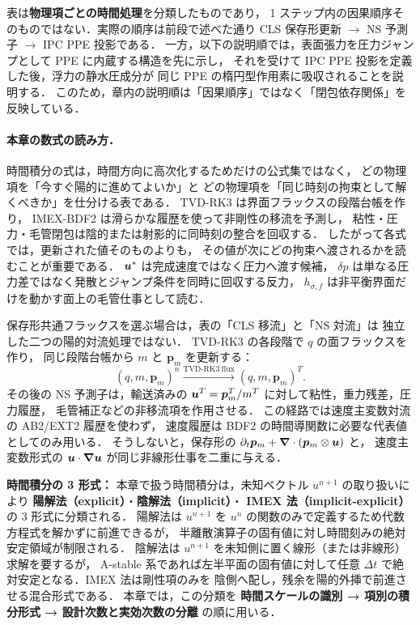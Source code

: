 表は\textbf{物理項ごとの時間処理}を分類したものであり，
1 ステップ内の因果順序そのものではない．実際の順序は前段で述べた通り
CLS 保存形更新 $\to$ NS 予測子 $\to$ IPC PPE 投影である．
一方，以下の説明順では，表面張力を圧力ジャンプとして PPE に内蔵する構造を先に示し，
それを受けて IPC PPE 投影を定義した後，浮力の静水圧成分が
同じ PPE の楕円型作用素に吸収されることを説明する．
このため，章内の説明順は「因果順序」ではなく「閉包依存関係」を反映している．

\paragraph{本章の数式の読み方．}
時間積分の式は，時間方向に高次化するためだけの公式集ではなく，
どの物理項を「今すぐ陽的に進めてよいか」と
どの物理項を「同じ時刻の拘束として解くべきか」を仕分ける表である．
TVD-RK3 は界面フラックスの段階台帳を作り，
IMEX-BDF2 は滑らかな履歴を使って非剛性の移流を予測し，
粘性・圧力・毛管閉包は陰的または射影的に同時刻の整合を回収する．
したがって各式では，更新された値そのものよりも，
その値が次にどの拘束へ渡されるかを読むことが重要である．
$\bm{u}^*$ は完成速度ではなく圧力へ渡す候補，
$\delta p$ は単なる圧力差ではなく発散とジャンプ条件を同時に回収する反力，
$h_{\sigma,f}$ は非平衡界面だけを動かす面上の毛管仕事として読む．

\begin{tcolorbox}[defbox, title={保存形共通フラックス経路の時間順序}]
保存形共通フラックスを選ぶ場合は，表の「CLS 移流」と「NS 対流」は
独立した二つの陽的対流処理ではない．
TVD-RK3 の各段階で $q$ の面フラックスを作り，
同じ段階台帳から $m$ と $\bm{p}_m$ を更新する：
\[
  (q,m,\bm{p}_m)^n
  \xrightarrow{\mathrm{TVD\text{-}RK3\ flux}}
  (q,m,\bm{p}_m)^T .
\]
その後の NS 予測子は，輸送済みの
$\bm{u}^T=\bm{p}_m^T/m^T$ に対して粘性，重力残差，圧力履歴，
毛管補正などの非移流項を作用させる．
この経路では速度主変数対流の AB2/EXT2 履歴を使わず，
速度履歴は BDF2 の時間導関数に必要な代表値としてのみ用いる．
そうしないと，保存形の
$\partial_t\bm{p}_m+\bm{\nabla}\cdot(\bm{p}_m\otimes\bm{u})$ と，
速度主変数形式の $\bm{u}\cdot\bm{\nabla}\bm{u}$ が同じ非線形仕事を二重に与える．
\end{tcolorbox}

\noindent\textbf{時間積分の 3 形式：}
本章で扱う時間積分は，未知ベクトル $u^{n+1}$ の取り扱いにより
\textbf{陽解法（explicit）}・\textbf{陰解法（implicit）}・
\textbf{IMEX 法（implicit-explicit）}の 3 形式に分類される．
陽解法は $u^{n+1}$ を $u^n$ の関数のみで定義するため代数方程式を解かずに前進できるが，
半離散演算子の固有値に対し時間刻みの絶対安定領域が制限される．
陰解法は $u^{n+1}$ を未知側に置く線形（または非線形）求解を要するが，
A-stable 系であれば左半平面の固有値に対して任意 $\Delta t$ で絶対安定となる．IMEX 法は剛性項のみを
陰側へ配し，残余を陽的外挿で前進させる混合形式である．
本章では，この分類を
\textbf{時間スケールの識別 → 項別の積分形式 → 設計次数と実効次数の分離}
の順に用いる．


